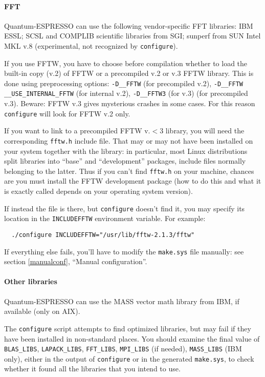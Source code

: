 \documentclass[12pt,a4paper]{article}
\begin{document}
\paragraph{FFT}

Quantum-ESPRESSO can use the following vendor-specific FFT 
libraries: IBM ESSL; SCSL and COMPLIB scientific libraries from SGI; 
sunperf from SUN Intel MKL v.8 (experimental, not recognized by 
\texttt{configure}).

If you use FFTW, you have to choose before compilation whether to load
the built-in copy (v.2) of FFTW or a precompiled v.2 or v.3 FFTW library. 
This is done using preprocessing options: 
\texttt{-D\_\_FFTW} (for precompiled v.2), 
\texttt{-D\_\_FFTW \_\_USE\_INTERNAL\_FFTW} (for internal v.2),
\texttt{-D\_\_FFTW3} (for v.3) (for precompiled v.3).
Beware: FFTW v.3 gives mysterious crashes in some cases. For this
reason \texttt{configure} will look for FFTW v.2 only.

If you want to link to a precompiled FFTW v.$<$3 library, you will need 
the corresponding \texttt{fftw.h} include file. That may or may not 
have been installed on your system together with the library: in
particular, most Linux distributions split libraries into ``base'' 
and ``development'' packages, include files normally belonging to the 
latter. Thus if you can't find \texttt{fftw.h} on your machine, chances
are you must install the FFTW development package (how to do this and
what it is exactly called depends  on your operating system version).

If instead the file is there, but \texttt{configure} doesn't find it,
you may specify its location in the \texttt{INCLUDEFFTW} environment
variable.
For example:
\begin{verbatim}
  ./configure INCLUDEFFTW="/usr/lib/fftw-2.1.3/fftw"
\end{verbatim}
If everything else fails, you'll have to modify the \texttt{make.sys}
file manually: see section \ref{manualconf}, ``Manual configuration''.

\paragraph{Other libraries}

Quantum-ESPRESSO can use the MASS vector math library from
IBM, if available (only on AIX).

The \texttt{configure} script attempts to find optimized libraries,
but may fail if they have been installed in non-standard places.
You should examine the final value of \texttt{BLAS\_LIBS},
\texttt{LAPACK\_LIBS}, \texttt{FFT\_LIBS}, \texttt{MPI\_LIBS} (if
needed), \texttt{MASS\_LIBS} (IBM only), either in the output of
\texttt{configure} or in the generated \texttt{make.sys}, to check
whether it found all the libraries that you intend to use.
\end{document}
